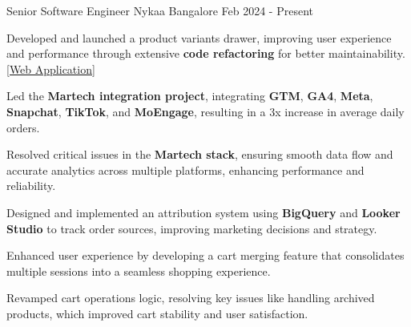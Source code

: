 
\begin{cventries}

\cventry
  {Senior Software Engineer}
  {Nykaa}
  {Bangalore}
  {Feb 2024 - Present}
  {
    \begin{cvitems}
      \item {Developed and launched a product variants drawer, improving user experience and performance through extensive \textbf{code refactoring} for better maintainability. \href{https://nysaa.com}{[Web Application]}}
      \item {Led the \textbf{Martech integration project}, integrating \textbf{GTM}, \textbf{GA4}, \textbf{Meta}, \textbf{Snapchat}, \textbf{TikTok}, and \textbf{MoEngage}, resulting in a 3x increase in average daily orders.}
      \item {Resolved critical issues in the \textbf{Martech stack}, ensuring smooth data flow and accurate analytics across multiple platforms, enhancing performance and reliability.}
      \item {Designed and implemented an attribution system using \textbf{BigQuery} and \textbf{Looker Studio} to track order sources, improving marketing decisions and strategy.}
      \item {Enhanced user experience by developing a cart merging feature that consolidates multiple sessions into a seamless shopping experience.}
      \item {Revamped cart operations logic, resolving key issues like handling archived products, which improved cart stability and user satisfaction.}
    \end{cvitems}
  }


\end{cventries}
